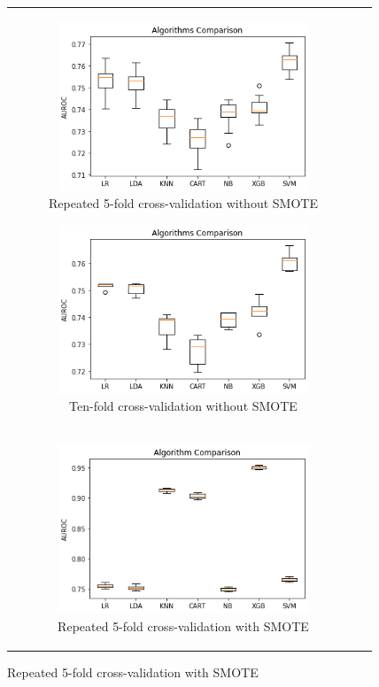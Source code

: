 \begin{figure}[H]
\begin{tabular}{@{}cc@{}}
\begin{subfigure}{0.5\textwidth}
  \centering
  \includegraphics[width=7.5cm]{fig/chapter5/Algorithm Comparison (no SMOTE, RSKFold).png}
  \caption{\footnotesize{Repeated 5-fold cross-validation without \acrshort{SMOTE}}}
  \label{fig:rskfoldnosmote}
\end{subfigure} 
\begin{subfigure}{0.5\textwidth}
  \centering
  \includegraphics[width=7.5cm]{fig/chapter5/Algorithm Comparison (no SMOTE, SKFold).png}
  \caption{\footnotesize{Ten-fold cross-validation without \acrshort{SMOTE}}}
  \label{fig:skfoldnosmote}
\end{subfigure} \\
\begin{subfigure}{0.5\textwidth}
  \centering
  \includegraphics[width=7.5cm]{fig/chapter5/Algorithm Comparison (SMOTE, RSKFold).png}
  \caption{\footnotesize{Repeated 5-fold cross-validation with \acrshort{SMOTE}}}

\end{subfigure}
\end{tabular}
\end{figure}
